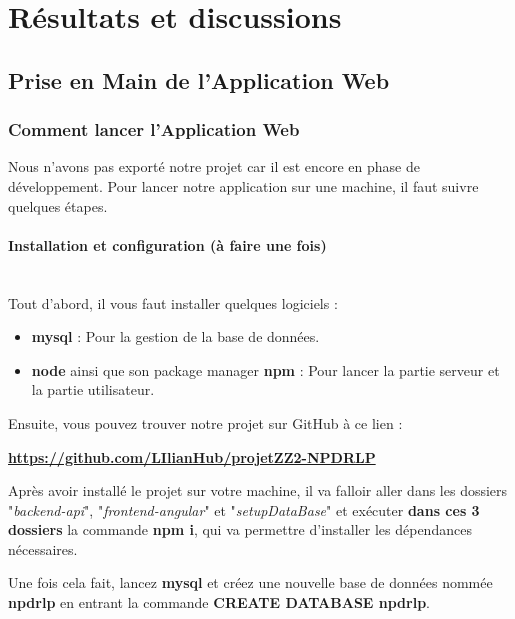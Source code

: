 \documentclass[12pt,french]{article}
\begin{document}
\section{Résultats et discussions}

\subsection{Prise en Main de l'Application Web}

\subsubsection{Comment lancer l'Application Web}

Nous n'avons pas exporté notre projet car il est encore en phase de développement. Pour lancer notre application sur une machine, il faut suivre quelques étapes.

\newpage

\paragraph{Installation et configuration (à faire une fois) \\\\}

Tout d'abord, il vous faut installer quelques logiciels :

\begin{itemize}
	\item \textbf{mysql} : Pour la gestion de la base de données.
	\item \textbf{node} ainsi que son package manager \textbf{npm} : Pour lancer la partie serveur et la partie utilisateur.
\end{itemize}

\bigskip

Ensuite, vous pouvez trouver notre projet sur GitHub à ce lien :

\textbf{\href{https://github.com/LIlianHub/projetZZ2-NPDRLP}{https://github.com/LIlianHub/projetZZ2-NPDRLP}}

\bigskip

Après avoir installé le projet sur votre machine, il va falloir aller dans les dossiers "\textit{backend-api}", "\textit{frontend-angular}" et "\textit{setupDataBase}" et exécuter \textbf{dans ces 3 dossiers} la commande \textbf{npm i}, qui va permettre d'installer les dépendances nécessaires.

\bigskip

Une fois cela fait, lancez \textbf{mysql} et créez une nouvelle base de données nommée \textbf{npdrlp} en entrant la commande \textbf{CREATE DATABASE npdrlp}.
\end{document}
